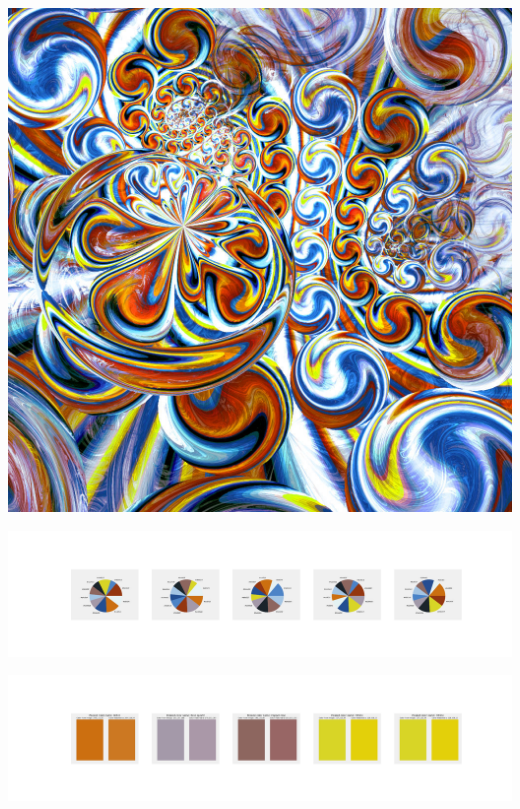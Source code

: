 \documentclass[11pt]{article}
\begin{document}
\begin{landscape}
    \begin{center}
    \includegraphics[width=\textwidth]{./nbimg/file (317).jpg}
    \end{center}

    \begin{center}
    \includegraphics[width=250mm]{./nbimg/pie-242.jpg}
    \end{center}

    \begin{center}
    \includegraphics[width=250mm]{./nbimg/peak-242.jpg}
    \end{center}
    


\end{landscape}
\end{document}
